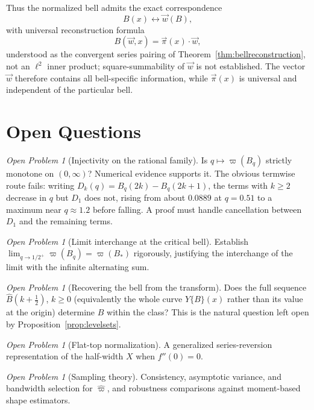 \documentclass[11pt]{article}
\theoremstyle{definition}
\theoremstyle{plain}
\theoremstyle{remark}
\newtheorem{openproblem}[definition]{Open Problem}
\begin{document}
Thus the normalized bell admits the exact correspondence
\[
\boxed{
B(x)
\longleftrightarrow
\vec{w}(B),
}
\]
with universal reconstruction formula
\[
\boxed{
B(\vec{w},x)
=
\vec{\pi}(x)\cdot\vec{w},
}
\]
understood as the convergent series pairing of Theorem~\ref{thm:bellreconstruction},
not an $\ell^2$ inner product; square-summability of $\vec w$ is not established.
The vector $\vec{w}$ therefore contains all bell-specific information, while
$\vec{\pi}(x)$ is universal and independent of the particular bell.

 
\section{Open Questions}
 

\begin{openproblem}[Injectivity on the rational family]\label{op:mono}
Is $q\mapsto\varpi(B_q)$ strictly monotone on $(0,\infty)$? Numerical evidence supports
it. The obvious termwise route fails: writing $D_k(q)=B_q(2k)-B_q(2k+1)$, the terms with
$k\ge2$ decrease in $q$ but $D_1$ does not, rising from about $0.0889$ at $q=0.51$ to a
maximum near $q\approx1.2$ before falling. A proof must handle cancellation between $D_1$
and the remaining terms.
\end{openproblem}

\begin{openproblem}[Limit interchange at the critical bell]\label{op:interchange}
Establish $\lim_{q\to1/2^+}\varpi(B_q)=\varpi(B_*)$ rigorously, justifying the
interchange of the limit with the infinite alternating sum.
\end{openproblem}

\begin{openproblem}[Recovering the bell from the transform]\label{op:coeff}
Does the full sequence $\widehat B\!\left(k+\tfrac12\right)$, $k\ge0$ (equivalently the
whole curve $Y\{B\}(x)$ rather than its value at the origin) determine $B$ within the
class? This is the natural question left open by Proposition~\ref{prop:levelsets}.
\end{openproblem}

\begin{openproblem}[Flat-top normalization]\label{op:flat}
A generalized series-reversion representation of the half-width $X$ when $f''(0)=0$.
\end{openproblem}

\begin{openproblem}[Sampling theory]\label{op:sampling}
Consistency, asymptotic variance, and bandwidth selection for $\hat\varpi$, and
robustness comparisons against moment-based shape estimators.
\end{openproblem}
\end{document}
